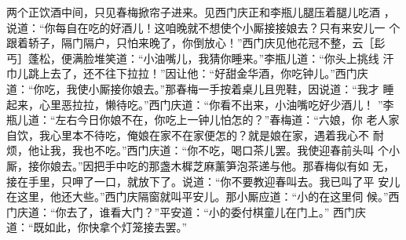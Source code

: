 两个正饮酒中间，只见春梅掀帘子进来。见西门庆正和李瓶儿腿压着腿儿吃酒
，说道：“你每自在吃的好酒儿！这咱晚就不想使个小厮接接娘去？只有来安儿一
个跟着轿子，隔门隔户，只怕来晚了，你倒放心！”西门庆见他花冠不整，云［髟
丐］蓬松，便满脸堆笑道：“小油嘴儿，我猜你睡来。”李瓶儿道：“你头上挑线
汗巾儿跳上去了，还不往下拉拉！”因让他：“好甜金华酒，你吃钟儿。”西门庆
道：“你吃，我使小厮接你娘去。”那春梅一手按着桌儿且兜鞋，因说道：“我才
睡起来，心里恶拉拉，懒待吃。”西门庆道：“你看不出来，小油嘴吃好少酒儿！
”李瓶儿道：“左右今日你娘不在，你吃上一钟儿怕怎的？”春梅道：“六娘，你
老人家自饮，我心里本不待吃，俺娘在家不在家便怎的？就是娘在家，遇着我心不
耐烦，他让我，我也不吃。”西门庆道：“你不吃，喝口茶儿罢。我使迎春前头叫
个小厮，接你娘去。”因把手中吃的那盏木樨芝麻薰笋泡茶递与他。那春梅似有如
无，接在手里，只呷了一口，就放下了。说道：“你不要教迎春叫去。我已叫了平
安儿在这里，他还大些。”西门庆隔窗就叫平安儿。那小厮应道：“小的在这里伺
候。”西门庆道：“你去了，谁看大门？”平安道：“小的委付棋童儿在门上。”
西门庆道：“既如此，你快拿个灯笼接去罢。”

